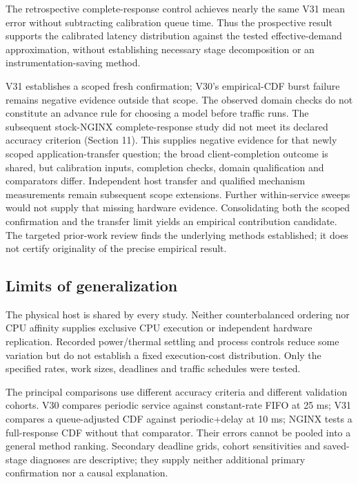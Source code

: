\documentclass[11pt,a4paper]{article}
\begin{document}
The retrospective complete-response control achieves nearly the same V31
mean error without subtracting calibration queue time. Thus the prospective
result supports the calibrated latency distribution against the tested
effective-demand approximation, without establishing necessary stage
decomposition or an instrumentation-saving method.

V31 establishes a scoped fresh confirmation; V30's empirical-CDF burst failure
remains negative evidence outside that scope. The observed domain checks do
not constitute an advance rule for choosing a model before traffic runs.
The subsequent stock-NGINX complete-response study did not meet its declared
accuracy criterion (Section 11). This supplies negative evidence for that newly
scoped application-transfer question; the broad client-completion outcome is
shared, but calibration inputs, completion checks, domain qualification and
comparators differ. Independent host transfer and qualified mechanism
measurements remain subsequent scope extensions. Further within-service sweeps
would not supply that missing hardware evidence. Consolidating both the scoped
confirmation and the transfer limit yields an empirical contribution candidate.
The targeted prior-work review finds the underlying methods
established; it does not certify originality of the precise empirical result.

\subsection{Limits of generalization}

The physical host is shared by every study. Neither counterbalanced ordering
nor CPU affinity supplies exclusive CPU execution or independent hardware
replication. Recorded power/thermal settling and process controls reduce some
variation but do not establish a fixed execution-cost distribution. Only the
specified rates, work sizes, deadlines and traffic schedules were tested.

The principal comparisons use different accuracy criteria and different
validation cohorts. V30 compares periodic service against constant-rate FIFO
at 25 ms; V31 compares a queue-adjusted CDF against periodic+delay at
10 ms; NGINX tests a full-response CDF without that comparator. Their errors
cannot be pooled into a general method ranking. Secondary deadline grids,
cohort sensitivities and saved-stage diagnoses are descriptive; they supply
neither additional primary confirmation nor a causal explanation.
\end{document}
